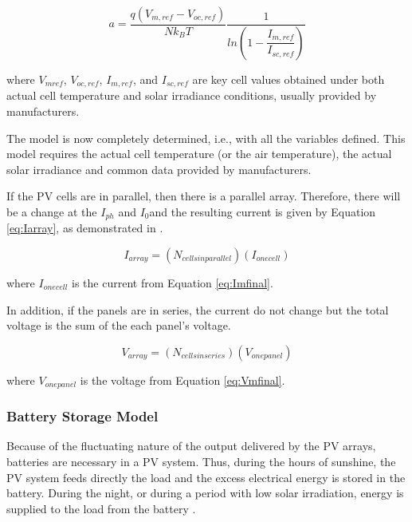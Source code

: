\begin{equation}
\label{eq:a}
a = \dfrac{q(V_{m,ref}-V_{oc,ref})}{Nk_{B}T} \dfrac{1}{ln \left( 1 - \dfrac{I_{m,ref}}{I_{sc,ref}}  \right) }
\end{equation}

\noindent where $ V_{mref} $, $ V_{oc,ref} $, $ I_{m,ref} $, and $ I_{sc,ref} $ are key cell values obtained under both actual cell temperature and solar irradiance conditions, usually provided by manufacturers.

The model is now completely determined, i.e., with all the variables defined. This model requires the actual cell temperature (or the air temperature), the actual solar irradiance and common data provided by manufacturers.

If the PV cells are in parallel, then there is a parallel array. Therefore, there will be a change at the $ I_{ph} $ and $ I_{0} $and the resulting current is given by Equation \ref{eq:Iarray}, as demonstrated in \cite{Saloux}.

\begin{equation}
\label{eq:Iarray}
I_{array} = (N_{cells in parallel})(I_{one cell})
\end{equation}

\noindent where $ I_{one cell} $ is the current from Equation \ref{eq:Imfinal}.

In addition, if the panels are in series, the current do not change but the total voltage is the sum of the each panel's voltage.

\begin{equation}
\label{eq:Varray}
V_{array} = (N_{cells in series})(V_{one panel})
\end{equation}

\noindent where $ V_{one panel} $ is the voltage from Equation \ref{eq:Vmfinal}.

\subsubsection{Battery Storage Model }

Because of the fluctuating nature of the output delivered by the PV arrays, batteries are necessary in a PV system. Thus, during the hours of sunshine, the PV system feeds directly the load and the excess electrical energy is stored in the battery. During the night, or during a period with low solar irradiation, energy is supplied to the load from the battery \cite{Mellit}.
  

